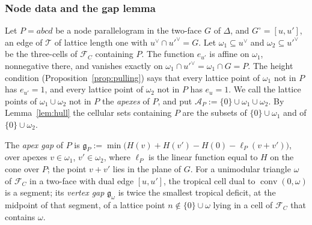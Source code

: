 \subsubsection*{Node data and the gap lemma}
\begin{definition}\label{def:node}
Let $P=abcd$ be a node parallelogram in the two-face $G$ of $\Delta$, and $G^\circ=[u,u']$, an edge of $\mathcal T$ of
lattice length one with $u^\vee\cap u'^\vee=G$. Let $\omega_1\subseteq u^\vee$ and $\omega_2\subseteq u'^\vee$ be the
three-cells of $\mathcal F_C$ containing $P$. The function $e_{u'}$ is affine on $\omega_1$, nonnegative there, and
vanishes exactly on $\omega_1\cap u'^\vee=\omega_1\cap G=P$. The height condition (Proposition~\ref{prop:pulling}) says
that every lattice point of $\omega_1$ not in $P$ has $e_{u'}=1$, and every lattice point of $\omega_2$ not in $P$ has
$e_u=1$. We call the lattice points of $\omega_1\cup\omega_2$ not in $P$ the \emph{apexes} of $P$, and put
$\mathcal A_P:=\{0\}\cup\omega_1\cup\omega_2$. By Lemma~\ref{lem:hull} the cellular sets containing $P$ are the subsets of
$\{0\}\cup\omega_1$ and of $\{0\}\cup\omega_2$.

The \emph{apex gap} of $P$ is $\mathfrak g_P:=\min\bigl(H(v)+H(v')-H(0)-\ell_P(v+v')\bigr)$, over apexes
$v\in\omega_1$, $v'\in\omega_2$, where $\ell_P$ is the linear function equal to $H$ on the cone over $P$; the point
$v+v'$ lies in the plane of $G$. For a unimodular triangle $\omega$ of $\mathcal F_C$ in a two-face with dual edge
$[u,u']$, the tropical cell dual to $\operatorname{conv}(0,\omega)$ is a segment; its \emph{vertex gap} $\mathfrak g_\omega$ is
twice the smallest tropical deficit, at the midpoint of that segment, of a lattice point $n\notin\{0\}\cup\omega$ lying in
a cell of $\mathcal F_C$ that contains $\omega$.


\end{definition}
